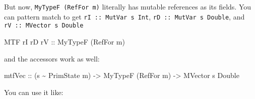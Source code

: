\documentclass[]{article}
\newenvironment{Shaded}{}{}
\newcommand{\CommentTok}[1]{\textcolor[rgb]{0.38,0.63,0.69}{\textit{#1}}}
\newcommand{\DataTypeTok}[1]{\textcolor[rgb]{0.56,0.13,0.00}{#1}}
\newcommand{\DecValTok}[1]{\textcolor[rgb]{0.25,0.63,0.44}{#1}}
\newcommand{\FloatTok}[1]{\textcolor[rgb]{0.25,0.63,0.44}{#1}}
\newcommand{\KeywordTok}[1]{\textcolor[rgb]{0.00,0.44,0.13}{\textbf{#1}}}
\newcommand{\NormalTok}[1]{#1}
\newcommand{\OperatorTok}[1]{\textcolor[rgb]{0.40,0.40,0.40}{#1}}
\newcommand{\OtherTok}[1]{\textcolor[rgb]{0.00,0.44,0.13}{#1}}
\begin{document}
But now, \texttt{MyTypeF\ (RefFor\ m)} literally has mutable references as its
fields. You can pattern match to get \texttt{rI\ ::\ MutVar\ s\ Int},
\texttt{rD\ ::\ MutVar\ s\ Double}, and \texttt{rV\ ::\ MVector\ s\ Double}

\begin{Shaded}
\begin{Highlighting}[]
\DataTypeTok{MTF}\NormalTok{ rI rD}\OtherTok{ rV ::} \DataTypeTok{MyTypeF}\NormalTok{ (}\DataTypeTok{RefFor}\NormalTok{ m)}
\end{Highlighting}
\end{Shaded}

and the accessors work as well:

\begin{Shaded}
\begin{Highlighting}[]
\NormalTok{mtfVec}
\OtherTok{    ::}\NormalTok{ (s }\OperatorTok{\textasciitilde{}} \DataTypeTok{PrimState}\NormalTok{ m)}
    \OtherTok{{-}>} \DataTypeTok{MyTypeF}\NormalTok{ (}\DataTypeTok{RefFor}\NormalTok{ m)}
    \OtherTok{{-}>} \DataTypeTok{MVector}\NormalTok{ s }\DataTypeTok{Double}
\end{Highlighting}
\end{Shaded}

You can use it like:

\begin{Shaded}
\end{Shaded}
\end{document}
